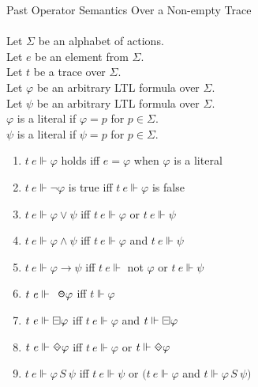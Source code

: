 \begin{definition}Past Operator Semantics Over a Non-empty Trace\\
\label{def:PastNon-emptyTraceSemantics}
\\
Let $\Sigma$ be an alphabet of actions.\\
Let $e$ be an element from $\Sigma$.\\
Let $t$ be a trace over $\Sigma$.\\
Let $\varphi$ be an arbitrary LTL formula over $\Sigma$.\\
Let $\psi$ be an arbitrary LTL formula over $\Sigma$.\\
$\varphi$ is a literal if $\varphi = p$ for $p \in \Sigma$.\\
$\psi$ is a literal if $\psi = p$ for $p \in \Sigma$.

\begin{enumerate}[start = 28]
\item $t\ e  \Vdash \varphi$ holds iff $e = \varphi $ when $\varphi$ is a literal
\item $t\ e  \Vdash \neg\varphi$ is true iff $t\ e \Vdash \varphi$ is false
\item $t\ e  \Vdash \varphi \lor \psi$ iff $t\ e \Vdash \varphi$ or $t\ e \Vdash \psi$
\item $t\ e  \Vdash \varphi \land \psi$ iff $t\ e \Vdash \varphi$ and $t\ e \Vdash \psi$
\item $t\ e  \Vdash \varphi \rightarrow \psi$ iff $t\ e \Vdash $ not $\varphi$ or $t\ e \Vdash \psi$
\item $t\ e  \Vdash \LTLprevious\varphi$ iff $t \Vdash \varphi$
\item $t\ e  \Vdash \LTLalwaysbeen\varphi$ iff $t\ e \Vdash \varphi$ and $t \Vdash \LTLalwaysbeen\varphi$
\item $t\ e  \Vdash \LTLonce\varphi$ iff $t\ e \Vdash \varphi$ or $t \Vdash \LTLonce\varphi$
\item $t\ e  \Vdash \varphi \,S\ \psi$ iff $t\ e \Vdash \psi$ or $(t\ e \Vdash \varphi$ and $t \Vdash \varphi \,S\ \psi)$
\end{enumerate}
\end{definition}